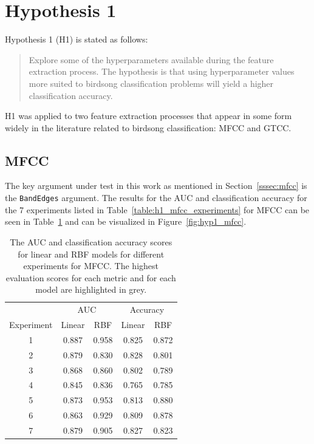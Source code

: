 \section{Hypothesis 1}

Hypothesis 1 (H1) is stated as follows:

\begin{quote}
Explore some of the hyperparameters available during the feature extraction
process. The hypothesis is that using hyperparameter values more suited to
birdsong classification problems will yield a higher classification accuracy.
\end{quote}

H1 was applied to two feature extraction processes that appear in some form
widely in the literature related to birdsong classification: MFCC and GTCC\@.

\subsection{MFCC}

The key argument under test in this work as mentioned in
Section~\ref{sssec:mfcc} is the \texttt{BandEdges} argument. The results for the
AUC and classification accuracy for the 7 experiments listed in
Table~\ref{table:h1_mfcc_experiments} for MFCC can be seen in
Table~\ref{table:hyp1_mfcc} and can be visualized in Figure~\ref{fig:hyp1_mfcc}.

\begin{table}[h!t]
\begin{center}
\begin{tabular}{cc c|c c}
\toprule
& \multicolumn{2}{c|}{AUC} & \multicolumn{2}{c}{Accuracy} \\
  Experiment & Linear & RBF & Linear & RBF \\ [0.5ex]
\midrule
  1 & \cellcolor{lightgray} 0.887 & \cellcolor{lightgray} 0.958 & 0.825 & 0.872 \\
  2 & 0.879 & 0.830 & \cellcolor{lightgray} 0.828 & 0.801 \\
  3 & 0.868 & 0.860 & 0.802 & 0.789 \\
  4 & 0.845 & 0.836 & 0.765 & 0.785 \\
  5 & 0.873 & 0.953 & 0.813 & \cellcolor{lightgray} 0.880 \\
  6 & 0.863 & 0.929 & 0.809 & 0.878 \\
  7 & 0.879 & 0.905 & 0.827 & 0.823 \\
\bottomrule
\end{tabular}
\caption{The AUC and classification accuracy scores for linear and RBF models
for different experiments for MFCC\@. The highest evaluation scores for each metric
and for each model are highlighted in grey.}\label{table:hyp1_mfcc}
\end{center}
\end{table}

